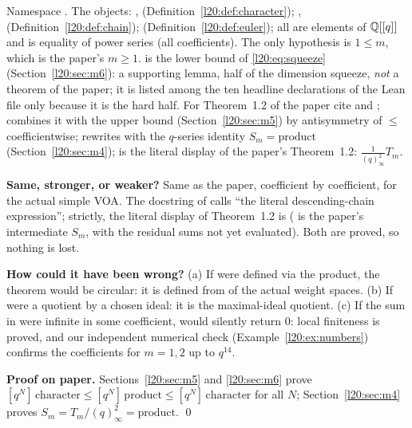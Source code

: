 \begin{dictionary}
Namespace . The objects: , 
(Definition~\ref{l20:def:character}); , 
(Definition~\ref{l20:def:chain});  (Definition~\ref{l20:def:euler}); all are elements of
${\mathbb{Q}}[[q]]$ and \lean{=} is equality of power series (all coefficients). The only hypothesis is $1\le m$, which is
the paper's $m\ge1$.  is the lower bound of \eqref{l20:eq:squeeze} (Section~\ref{l20:sec:m6}):
a supporting lemma, half of the dimension squeeze, \emph{not} a theorem of the paper; it is listed among the ten headline
declarations of the Lean file only because it is the hard half. For Theorem~1.2 of the paper cite
 and ;
 combines it with the upper bound  (Section~\ref{l20:sec:m5})
by antisymmetry of $\le$ coefficientwise;  rewrites with the $q$-series identity
$S_m=\text{product}$ (Section~\ref{l20:sec:m4});  is the literal display of the paper's
Theorem~1.2: $\frac{1}{(q)^2_\infty}T_m$.

\textbf{Same, stronger, or weaker?} Same as the paper, coefficient by coefficient, for the actual simple VOA.
The docstring of  calls  ``the literal descending-chain
expression''; strictly, the literal display of Theorem~1.2 is 
( is the paper's intermediate $S_m$, with the residual sums not yet evaluated). Both
are proved, so nothing is lost.

\textbf{How could it have been wrong?} (a) If  were defined via the product, the theorem
would be circular: it is defined from  of the actual weight spaces. (b) If 
were a quotient by a chosen ideal: it is the maximal-ideal quotient. (c) If the sum in 
were infinite in some coefficient,  would silently return $0$: local finiteness is proved, and our
independent numerical check (Example~\ref{l20:ex:numbers}) confirms the coefficients for $m=1,2$ up to $q^{14}$.
\end{dictionary}

\textbf{Proof on paper.} Sections~\ref{l20:sec:m5} and \ref{l20:sec:m6} prove
$[q^N]\,\mathrm{character}\le[q^N]\,\mathrm{product}\le[q^N]\,\mathrm{character}$ for all $N$; Section~\ref{l20:sec:m4}
proves $S_m=T_m/(q)_\infty^2=\mathrm{product}$. \qed

